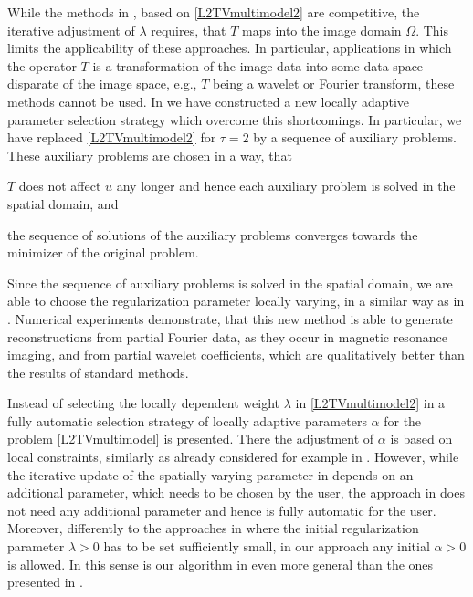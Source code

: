 \documentclass[enabledeprecatedfontcommands,cleardoublepage=empty,headsepline,twoside,11pt,DIV=15,BCOR=12mm,final]{scrartcl}
\begin{document}
While the methods in \cite{DonHinRin, HinRin}, based on \eqref{L2TVmultimodel2} are competitive, the iterative adjustment of $\lambda$ requires, that $T$ maps into the image domain $\Omega$. This limits the applicability of these approaches. In particular, applications in which the operator $T$ is a transformation of the image data into some data space disparate of the image space, e.g., $T$ being a wavelet or Fourier transform, these methods cannot be used. In  we have constructed a new locally adaptive parameter selection strategy which overcome this shortcomings. In particular, we have replaced \eqref{L2TVmultimodel2} for $\tau=2$ by a sequence of auxiliary problems. These auxiliary problems are chosen in a way, that
\begin{inparaenum}[(i)]
\item $T$ does not affect $u$ any longer and hence each auxiliary problem is solved in the spatial domain, and
\item the sequence of solutions of the auxiliary problems converges towards the minimizer of the original problem.
\end{inparaenum}
Since the sequence of auxiliary problems is solved in the spatial domain, we are able to choose the regularization parameter locally varying, in a similar way as in \cite{DonHinRin}.  Numerical experiments demonstrate, that this new method is able to generate reconstructions from partial Fourier data, as they occur in magnetic resonance imaging, and from partial wavelet coefficients, which are qualitatively better than the results of standard methods.

Instead of selecting the locally dependent weight $\lambda$ in \eqref{L2TVmultimodel2} in  a fully automatic selection strategy of locally adaptive parameters $\alpha$ for the problem \eqref{L2TVmultimodel} is presented. There the adjustment of $\alpha$ is based on local constraints, similarly as already considered for example in \cite{AlmBalCasHar,DonHinRin,HinRin}. However, while the iterative update of the spatially varying parameter in \cite{AlmBalCasHar,DonHinRin,HinRin} depends on an additional parameter, which needs to be chosen by the user, the approach in  does not need any additional parameter and hence is fully automatic for the user. Moreover, differently to the approaches in \cite{DonHinRin,HinRin} where the initial regularization parameter $\lambda>0$ has to be set sufficiently small, in our approach any initial $\alpha>0$ is allowed. In this sense is our algorithm in  even more general than the ones presented in \cite{DonHinRin,HinRin}.
\end{document}
